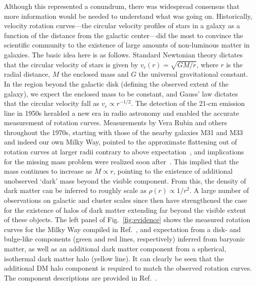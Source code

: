 Although this represented a conundrum, there was widespread consensus that more information would be needed to understand what was going on. Historically, velocity rotation curves---the circular velocity profiles of stars in a galaxy as a function of the distance from the galactic center---did the most to convince the scientific community to the existence of large amounts of non-luminous matter in galaxies. The basic idea here is as follows. Standard Newtonian theory dictates that the circular velocity of stars is given by $v_c(r) = \sqrt{GM/r}$, where $r$ is the radial distance, $M$ the enclosed mass and $G$ the universal gravitational constant. In the region beyond the galactic disk (defining the observed extent of the galaxy), we expect the enclosed mass to be constant, and Gauss' law dictates that the circular velocity fall as $v_c \propto r^{-1/2}$. The detection of the 21-cm emission line in 1950s heralded a new era in radio astronomy and enabled the accurate measurement of rotation curves. Measurements by Vera Rubin and others throughout the 1970s, starting with those of the nearby galaxies M31 and M33 and indeed our own Milky Way, pointed to the approximate flattening out of rotation curves at larger radii contrary to above expectation~\cite{1970ApJ...159..379R,1973A&A....26..483R}, and implications for the missing mass problem were realized soon after~\cite{1974Natur.250..309E,1974ApJ...193L...1O}. This implied that the mass continues to increase as $M \propto r$, pointing to the existence of additional unobserved `dark' mass beyond the visible component. From this, the density of dark matter can be inferred to roughly scale as $\rho(r) \propto 1/r^2$. A large number of observations on galactic and cluster scales since then have strengthened the case for the existence of halos of dark matter extending far beyond the visible extent of these objects. The left panel of Fig.~\ref{fig:evidence} shows the measured rotation curves for the Milky Way compiled in Ref.~\cite{2009PASJ...61..227S}, and expectation from a disk- and bulge-like components (green and red lines, respectively) inferred from baryonic matter, as well as an additional dark matter component from a spherical, isothermal dark matter halo (yellow line). It can clearly be seen that the additional DM halo component is required to match the observed rotation curves. The component descriptions are provided in Ref.~\cite{2009PASJ...61..227S}.

